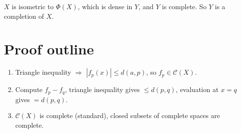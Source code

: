 \documentclass[12pt]{article}
\begin{document}
$X$ is isometric to $\Phi(X)$, which is dense in $Y$, and $Y$ is complete. So $Y$ is a completion of $X$.

\section*{Proof outline}
\begin{enumerate}
    \item Triangle inequality $\Rightarrow$ $|f_p(x)| \leq d(a,p)$, so $f_p \in \mathscr{C}(X)$.
    \item Compute $f_p - f_q$, triangle inequality gives $\leq d(p,q)$, evaluation at $x=q$ gives $= d(p,q)$.
    \item $\mathscr{C}(X)$ is complete (standard), closed subsets of complete spaces are complete.
\end{enumerate}
\end{document}
